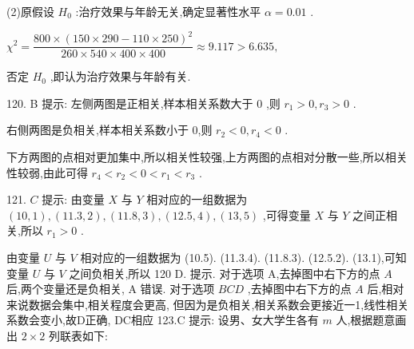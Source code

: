 \begin{center}
\end{center}

(2)原假设 ${H}_{0}$ :治疗效果与年龄无关,确定显著性水平 $\alpha  = {0.01}$ .

${\chi }^{2} = \dfrac{{800} \times  {\left( {150} \times  {290} - {110} \times  {250}\right) }^{2}}{{260} \times  {540} \times  {400} \times  {400}} \approx  {9.117} > {6.635},$

否定 ${H}_{0}$ ,即认为治疗效果与年龄有关.

120. B 提示: 左侧两图是正相关,样本相关系数大于 0 ,则 ${r}_{1} > 0,{r}_{3} > 0$ .

右侧两图是负相关,样本相关系数小于 0,则 ${r}_{2} < 0,{r}_{4} < 0$ .

下方两图的点相对更加集中,所以相关性较强,上方两图的点相对分散一些,所以相关性较弱,由此可得 ${r}_{4} < {r}_{2} < 0 < {r}_{1} < {r}_{3}$ .

121. $C$ 提示: 由变量 $X$ 与 $Y$ 相对应的一组数据为 $\left( {{10},1}\right) ,\left( {{11.3},2}\right) ,\left( {{11.8},3}\right) ,\left( {{12.5},4}\right) ,\left( {{13},5}\right)$ ,可得变量 $X$ 与 $Y$ 之间正相关,所以 ${r}_{1} > 0$ .

由变量 $U$ 与 $V$ 相对应的一组数据为 (10.5). (11.3.4). (11.8.3). (12.5.2). (13.1),可知变量 $U$ 与 $V$ 之间负相关,所以 120 D. 提示. 对于选项 A,去掉图中右下方的点 $A$ 后,两个变量还是负相关, A 错误. 对于选项 ${BCD}$ ,去掉图中右下方的点 $A$ 后,相对来说数据会集中,相关程度会更高, 但因为是负相关,相关系数会更接近一1,线性相关系数会变小,故D正确, DC相应 123.C 提示: 设男、女大学生各有 $m$ 人,根据题意画出 $2 \times  2$ 列联表如下:

\begin{center}
\end{center}

